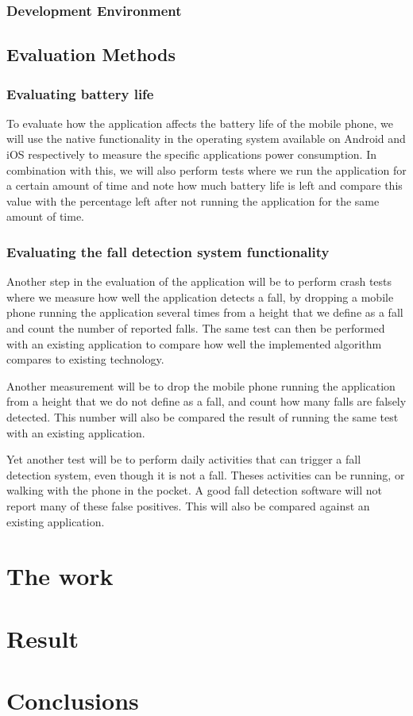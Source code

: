 \documentclass[12pt, a4paper, onecolumn]{article}
\begin{document}
\subsubsection{Development Environment}

\subsection{Evaluation Methods}

\subsubsection{Evaluating battery life}

To evaluate how the application affects the battery life of the mobile phone, we will use the native functionality in the operating system available on Android and iOS respectively to measure the specific applications power consumption.
In combination with this, we will also perform tests where we run the application for a certain amount of time and note how much battery life is left and compare this value with the percentage left after not running the application for the same amount of time.

\subsubsection{Evaluating the fall detection system functionality}

Another step in the evaluation of the application will be to perform crash tests where we measure how well the application detects a fall, by dropping a mobile phone running the application several times from a height that we define as a fall and count the number of reported falls. The same test can then be performed with an existing application to compare how well the implemented algorithm compares to existing technology.

Another measurement will be to drop the mobile phone running the application from a height that we do not define as a fall, and count how many falls are falsely detected. This number will also be compared the result of running the same test with an existing application.

Yet another test will be to perform daily activities that can trigger a fall detection system, even though it is not a fall. Theses activities can be running, or walking with the phone in the pocket. A good fall detection software will not report many of these false positives. This will also be compared against an existing application.


	   
	\newpage
	
	
	
	\section{The work}
	\newpage
	
	\section{Result}
	\newpage
	
	\section{Conclusions}
	\newpage
	
	
\end{document}
